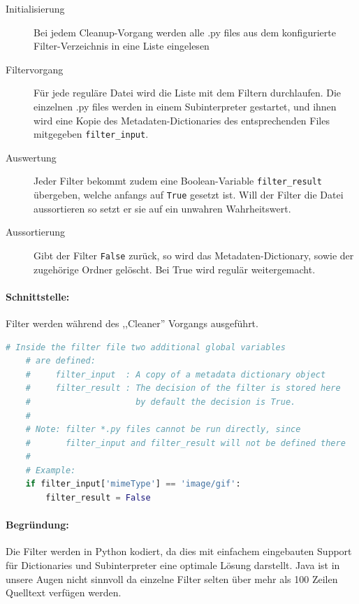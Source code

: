 \begin{description}
  \item[Initialisierung] Bei jedem Cleanup-Vorgang werden alle .py files
    aus dem konfigurierte Filter-Verzeichnis in eine Liste eingelesen
  \item[Filtervorgang] Für jede reguläre Datei wird die Liste mit dem
    Filtern durchlaufen. Die einzelnen .py files werden in einem
    Subinterpreter gestartet, und ihnen wird eine Kopie des
    Metadaten-Dictionaries des entsprechenden Files mitgegeben
    \texttt{filter\_input}.
  \item[Auswertung] Jeder Filter bekommt zudem eine Boolean-Variable
    \texttt{filter\_result} übergeben, welche anfangs auf \texttt{True}
    gesetzt ist. Will der Filter die Datei aussortieren so setzt er sie
    auf ein unwahren Wahrheitswert. 
  \item[Aussortierung] Gibt der Filter \texttt{False} zurück, so wird
    das Metadaten-Dictionary, sowie der zugehörige Ordner gelöscht. 
    Bei True wird regulär weitergemacht.
\end{description}

\paragraph{Schnittstelle:}
\label{par:schnittstelle_}
Filter werden während des ,,Cleaner'' Vorgangs ausgeführt.
\begin{lstlisting}[language=python]
    # Inside the filter file two additional global variables
    # are defined:
    #     filter_input  : A copy of a metadata dictionary object
    #     filter_result : The decision of the filter is stored here
    #                     by default the decision is True.
    #
    # Note: filter *.py files cannot be run directly, since 
    #       filter_input and filter_result will not be defined there
    #
    # Example:
    if filter_input['mimeType'] == 'image/gif':
        filter_result = False
\end{lstlisting}

\paragraph{Begründung:}
\label{par:begr_ndung_}
Die Filter werden in Python kodiert, da dies mit einfachem eingebauten Support für
Dictionaries und Subinterpreter eine optimale Lösung darstellt.
Java ist in unsere Augen nicht sinnvoll da einzelne Filter
selten über mehr als 100 Zeilen Quelltext verfügen werden.


